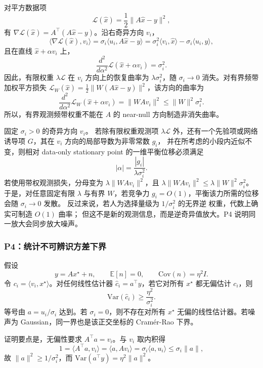 对平方数据项
\[
  \mathcal L(\hat{x})=\frac12\|A\hat{x}-y\|^2,
\]
有 \(\nabla\mathcal L(\hat{x})=A^\top(A\hat{x}-y)\)。沿右奇异方向 \(v_i\)，
\[
  \langle\nabla\mathcal L(\hat{x}),v_i\rangle
  =\sigma_i\langle u_i,A\hat{x}-y\rangle
  =\sigma_i^2\langle v_i,\hat{x}\rangle-\sigma_i\langle u_i,y\rangle,
\]
且在直线 \(\hat{x}+\alpha v_i\) 上，
\[
  \frac{d^2}{d\alpha^2}\mathcal L(\hat{x}+\alpha v_i)=\sigma_i^2.
\]
因此，有限权重 \(\lambda\mathcal L\) 在 \(v_i\) 方向上的恢复曲率为 \(\lambda\sigma_i^2\)，随 \(\sigma_i\to0\) 消失。对有界频带加权平方损失
\(\mathcal L_W(\hat{x})=\frac12\|W(A\hat{x}-y)\|^2\)，该方向的曲率为
\[
  \frac{d^2}{d\alpha^2}\mathcal L_W(\hat{x}+\alpha v_i)=\|WAv_i\|^2\le\|W\|^2\sigma_i^2.
\]
所以，有界观测频带权重不能在 \(A\) 的 near-null 方向制造非消失曲率。

固定 \(\sigma_i>0\) 的奇异方向 \(v_i\)。
若除有限权重观测项 \(\lambda\mathcal L\) 外，还有一个先验项或网络诱导项 \(G\)，其在 \(v_i\) 方向的局部导数为非零常数 \(g_i\)，
并在所考虑的小段内近似不变，则相对 data-only stationary point 的一维平衡位移必须满足
\[
  |\alpha|=\frac{|g_i|}{\lambda\sigma_i^2}.
\]
若使用带权观测损失，分母变为 \(\lambda\|WAv_i\|^2\)，且 \(\lambda\|WAv_i\|^2\le\lambda\|W\|^2\sigma_i^2\)。
于是，对任意固定有限 \(\lambda\) 与有界 \(W\)，若竞争力 \(g_i=O(1)\)，平衡该力所需的位移会随 \(\sigma_i\to0\) 发散。
反过来说，若人为选择量级为 \(1/\sigma_i^2\) 的无界逆  权重，代数上确实可制造 \(O(1)\) 曲率；
但这不是新的观测信息，而是逆奇异值放大。P4 说明同一放大会同步放大噪声。

\subsubsection{P4：统计不可辨识方差下界}

假设
\[
  y=A x^\star+n,\qquad \mathbb E[n]=0,\qquad \mathrm{Cov}(n)=\eta^2 I.
\]
令 \(c_i=\langle v_i,x^\star\rangle\)。对任何线性估计器 \(\hat c_i=a^\top y\)，若它对所有 \(x^\star\) 都无偏估计 \(c_i\)，则
\[
  \mathrm{Var}(\hat c_i)\ge\frac{\eta^2}{\sigma_i^2}.
\]
等号由 \(a=u_i/\sigma_i\) 达到。若 \(\sigma_i=0\)，则不存在对所有 \(x^\star\) 无偏的线性估计器。若噪声为 Gaussian，同一界也是该正交坐标的 Cramér-Rao 下界。

证明要点是，无偏性要求 \(A^\top a=v_i\)。与 \(v_i\) 取内积得
\[
  1=\langle A^\top a,v_i\rangle=\langle a,Av_i\rangle=\sigma_i\langle a,u_i\rangle\le\sigma_i\|a\|,
\]
故 \(\|a\|^2\ge1/\sigma_i^2\)，而 \(\mathrm{Var}(a^\top y)=\eta^2\|a\|^2\)。

